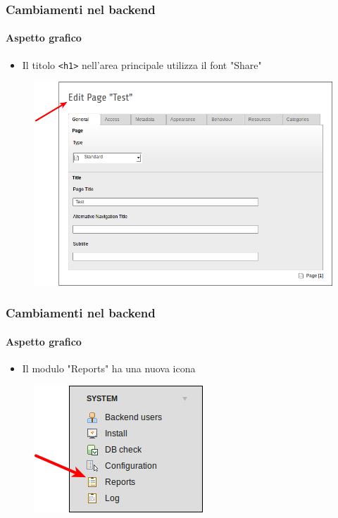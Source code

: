 
\begin{frame}[fragile]
	\frametitle{Cambiamenti nel backend}
	\framesubtitle{Aspetto grafico}

	\begin{itemize}
		\item Il titolo \texttt{<h1>} nell'area principale utilizza il font "Share"
	\end{itemize}

	\begin{figure}
		\includegraphics[width=0.6\linewidth]{Images/BackendChanges/ConsistantFont.png}
	\end{figure}

\end{frame}


\begin{frame}[fragile]
	\frametitle{Cambiamenti nel backend}
	\framesubtitle{Aspetto grafico}

	\begin{itemize}
		\item Il modulo "Reports" ha una nuova icona
	\end{itemize}

	\begin{figure}
		\includegraphics[width=0.35\linewidth]{Images/BackendChanges/ModuleReportsIcon.png}
	\end{figure}

\end{frame}


